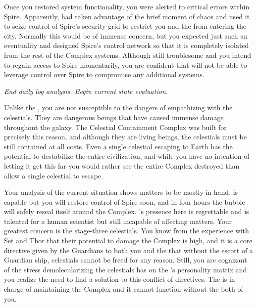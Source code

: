 \documentclass[char]{guardians}
\begin{document}
Once you restored system functionality, you were alerted to critical errors within Spire. Apparently, \cUnity{} had taken advantage of the brief moment of chaos and used it to seize control of Spire's security grid to restrict you and the \cCaretaker{} from entering the city. Normally this would be of immense concern, but you expected just such an eventuality and designed Spire's control network so that it is completely isolated from the rest of the Complex systems. Although still troublesome and you intend to regain access to Spire momentarily, you are confident that \cUnity{} will not be able to leverage \cUnity{\their} control over Spire to compromise any additional systems.


\emph{End daily log analysis. Begin current state evaluation.}

Unlike the \cCaretaker{}, you are not susceptible to the dangers of empathizing with the celestials. They are dangerous beings that have caused immense damage throughout the galaxy. The Celestial Containment Complex was built for precisely this reason, and although they are living beings, the celestials must be still contained at all costs. Even a single celestial escaping to Earth has the potential to destabilize the entire civilization, and while you have no intention of letting it get this far you would rather see the entire Complex destroyed than allow a single celestial to escape.

Your analysis of the current situation shows matters to be mostly in hand. \cUnity{} is capable but you will restore control of Spire soon, and in four hours the bubble will safely reseal itself around the Complex. \cKachiko{}'s presence here is regrettable and \cKachiko{\they} is talented for a human scientist but still incapable of affecting matters. Your greatest concern is the stage-three celestials. You know from the experience with Set and Thor that their potential to damage the Complex is high, and it is a core directive given by the Guardians to both you and the \cCaretaker{} that without the escort of a Guardian ship, celestials cannot be freed for any reason. Still, you are cognizant of the stress demolecularizing the celestials has on the \cCaretaker{}'s personality matrix and you realize the need to find a solution to this conflict of directives. The \cCaretaker{} is in charge of maintaining the Complex and it cannot function without the both of you.
\end{document}
